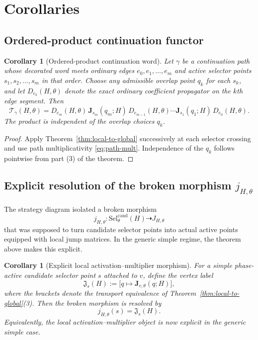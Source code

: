 \documentclass[11pt]{article}
\numberwithin{equation}{section}
\newtheorem{corollary}[theorem]{Corollary}
\theoremstyle{definition}
\newcommand{\Jemb}{\mathbf J_{v,\theta}}
\newcommand{\Tfun}{\mathcal T}
\newcommand{\Selcand}{\mathrm{Sel}^{\mathrm{cand}}_\theta(H)}
\newcommand{\Jclass}{\mathfrak J_s(H)}
\begin{document}
\section{Corollaries}

\subsection{Ordered-product continuation functor}

\begin{corollary}[Ordered-product continuation word]
\label{cor:ordered-product}
Let $\gamma$ be a continuation path whose decorated word meets ordinary edges $e_0,e_1,\dots,e_m$ and active selector points $s_1,s_2,\dots,s_m$ in that order. Choose any admissible overlap point $q_k$ for each $s_k$, and let $D_{e_k}(H,\theta)$ denote the exact ordinary coefficient propagator on the $k$th edge segment. Then
\begin{equation}
\label{eq:ordered-product}
\Tfun_\gamma(H,\theta)=D_{e_m}(H,\theta)\,\mathbf J_{s_m}(q_m;H)\,D_{e_{m-1}}(H,\theta)\cdots
\mathbf J_{s_1}(q_1;H)\,D_{e_0}(H,\theta).
\end{equation}
The product is independent of the overlap choices $q_k$.
\end{corollary}

\begin{proof}
Apply Theorem~\ref{thm:local-to-global} successively at each selector crossing and use path multiplicativity \eqref{eq:path-mult}. Independence of the $q_k$ follows pointwise from part (3) of the theorem.
\end{proof}

\subsection{Explicit resolution of the broken morphism $j_{H,\theta}$}

The strategy diagram isolated a broken morphism
\[
 j_{H,\theta}:\Selcand\dashrightarrow J_{H,\theta}
\]
that was supposed to turn candidate selector points into actual active points equipped with local jump matrices. In the generic simple regime, the theorem above makes this explicit.

\begin{corollary}[Explicit local activation--multiplier morphism]
\label{cor:j-explicit}
For a simple phase-active candidate selector point $s$ attached to $v$, define the vertex label
\begin{equation}
\label{eq:Jclass-def}
\Jclass:=\bigl[ q\longmapsto \Jemb(q;H)\bigr],
\end{equation}
where the brackets denote the transport equivalence of Theorem~\ref{thm:local-to-global}(3). Then the broken morphism is resolved by
\begin{equation}
\label{eq:j-explicit}
 j_{H,\theta}(s)=\Jclass.
\end{equation}
Equivalently, the local activation--multiplier object is now explicit in the generic simple case.
\end{corollary}
\end{document}
